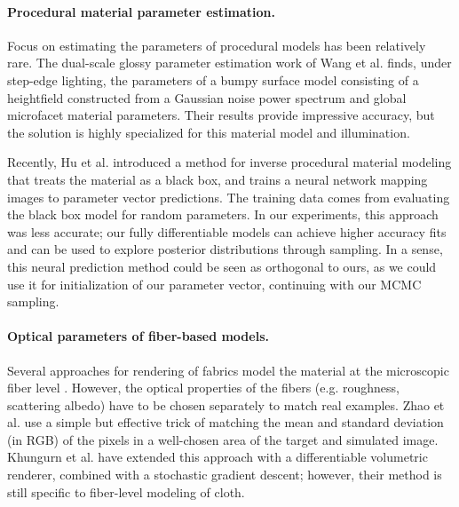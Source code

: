 \paragraph*{Procedural material parameter estimation.} Focus on estimating the parameters of procedural models has been relatively rare. The dual-scale glossy parameter estimation work of Wang et al. \cite{Wang2011} finds, under step-edge lighting, the parameters of a bumpy surface model consisting of a heightfield constructed from a Gaussian noise power spectrum and global microfacet material parameters. Their results provide impressive accuracy, but the solution is highly specialized for this material model and illumination.

Recently, Hu et al. \cite{Hu2019} introduced a method for inverse procedural material modeling that treats the material as a black box, and trains a neural network mapping images to parameter vector predictions. The training data comes from evaluating the black box model for random parameters. In our experiments, this approach was less accurate; our fully differentiable models can achieve higher accuracy fits and can be used to explore posterior distributions through sampling. In a sense, this neural prediction method could be seen as orthogonal to ours, as we could use it for initialization of our parameter vector, continuing with our MCMC sampling.

\paragraph*{Optical parameters of fiber-based models.} Several approaches for rendering of fabrics model the material at the microscopic fiber level \cite{Zhao2011,Zhao2016,Leaf2018}. However, the optical properties of the fibers (e.g. roughness, scattering albedo) have to be chosen separately to match real examples. Zhao et al. \cite{Zhao2011} use a simple but effective trick of matching the mean and standard deviation (in RGB) of the pixels in a well-chosen area of the target and simulated image. Khungurn et al. \cite{Khungurn2015} have extended this approach with a differentiable volumetric renderer, combined with a stochastic gradient descent; however, their method is still specific to fiber-level modeling of cloth.

